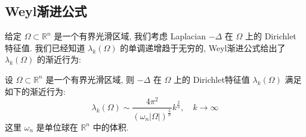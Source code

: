 \documentclass[11pt]{ctexart}[UTF8]
\begin{document}
\subsection{Weyl渐进公式}
给定 $\Omega \subset \mathbb{R}^n$ 是一个有界光滑区域, 我们考虑 Laplacian $-\Delta$ 在 $\Omega$ 上的 Dirichlet 特征值. 我们已经知道
$\lambda_k(\Omega)$ 的单调递增趋于无穷的, Weyl渐进公式给出了 $\lambda_k(\Omega)$ 的渐近行为:
\begin{theorem}[Weyl渐进公式]
    设 $\Omega \subset \mathbb{R}^n$ 是一个有界光滑区域, 则 $-\Delta$ 在 $\Omega$ 上的 Dirichlet特征值 $\lambda_k(\Omega)$ 满足如下的渐近行为:
    \begin{equation}\label{Weyl}
        \lambda_k(\Omega) \sim \frac{4\pi^2}{(\omega_n |\Omega|)^{\frac{2}{n}}} k^{\frac{2}{n}}, \quad k \to \infty
    \end{equation}
    这里 $\omega_n$ 是单位球在 $\mathbb{R}^n$ 中的体积.
\end{theorem}
\end{document}
